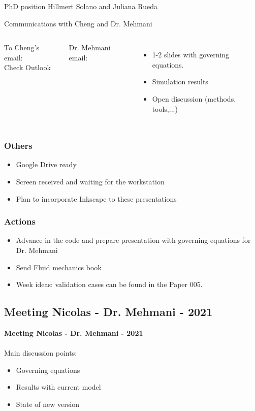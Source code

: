 \documentclass{beamer}
\begin{document}
		\begin{frame}{PhD position}
			Hillmert Solano and Juliana Rueda
		\end{frame}
	
		\begin{frame}{Communications with Cheng and Dr. Mehmani}
			\begin{columns}[T]
				\justifying
				To Cheng's email:\\
				\alert{Check Outlook}
				
				Dr. Mehmani email:
				\begin{itemize}
					\item 1-2 slides with governing equations. 
					\item Simulation results
					\item Open discussion (methods, tools,...)
				\end{itemize}
			\end{columns}
		\end{frame}
	
		\begin{frame}
			\frametitle{Others}
			\begin{itemize}
				\item Google Drive ready
				\item Screen received and waiting for the workstation
				\item Plan to incorporate Inkscape to these presentations
			\end{itemize}
		\end{frame}
	
		\begin{frame}
			\frametitle{Actions}
			\begin{itemize}
				\item Advance in the code and prepare presentation with governing equations for Dr. Mehmani
				\item Send Fluid mechanics book
				
				\item Week ideas: validation cases can be found in the Paper 005.
			\end{itemize}
		\end{frame}
		
		
		\subsection{Meeting Nicolas - Dr. Mehmani - 2021}
		\justifying
		\begin{frame}
			\textbf{Meeting Nicolas - Dr. Mehmani - 2021}\\~\\
			Main discussion points:
			\begin{itemize}
				\item Governing equations
				\item Results with current model
				\item State of new version
			\end{itemize}
		\end{frame}
		
\end{document}
